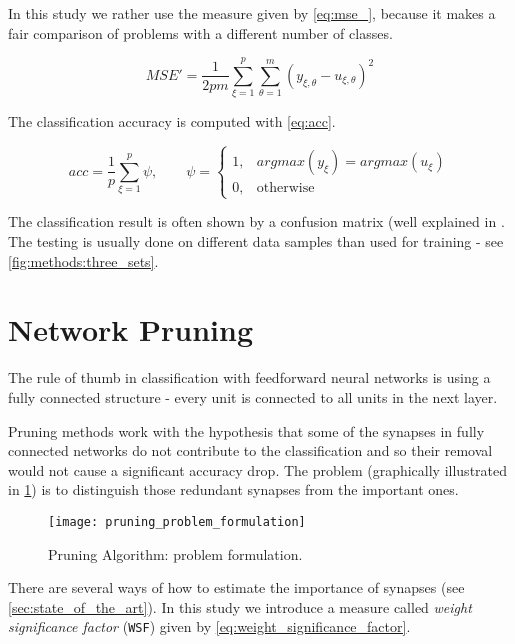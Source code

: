 In this study we rather use the measure given by \cref{eq:mse_}, because it makes a fair comparison of problems with a different number of classes.

\begin{equation} \label{eq:mse_}
MSE' = \frac{1}{2 p m} \displaystyle \sum^{p}_{\xi=1} \displaystyle \sum^{m}_{\theta=1} (y_{\xi,\theta} - u_{\xi,\theta})^2
\end{equation}

The classification accuracy is computed with \cref{eq:acc}.

\begin{equation} \label{eq:acc}
acc = \frac{1}{p} \displaystyle \sum^{p}_{\xi=1} \psi, \qquad \psi = \begin{cases}
    1, & argmax(y_{\xi}) = argmax(u_{\xi}) \\
    0, & \text{otherwise}
\end{cases} 
\end{equation}

The classification result is often shown by a confusion matrix (well explained in \citep{sklearn}. The testing is usually done on different data samples than used for training - see \cref{fig:methods:three_sets}.

\section{Network Pruning} \label{sec:network_pruning}
The rule of thumb in classification with feedforward neural networks is using a fully connected structure - every unit is connected to all units in the next layer. 

Pruning methods work with the hypothesis that some of the synapses in fully connected networks do not contribute to the classification and so their removal would not cause a significant accuracy drop. The problem (graphically illustrated in \cref{fig:methods:pruning_problem_formulation}) is to distinguish those redundant synapses from the important ones.

\begin{figure}[H]
  \centering
  \texttt{[image: pruning\_problem\_formulation]}
  \caption{Pruning Algorithm: problem formulation.}
  \label{fig:methods:pruning_problem_formulation}
\end{figure}

There are several ways of how to estimate the importance of synapses (see \cref{sec:state_of_the_art}). In this study we introduce a measure called \textit{weight significance factor} (\texttt{WSF}) given by \cref{eq:weight_significance_factor}.


